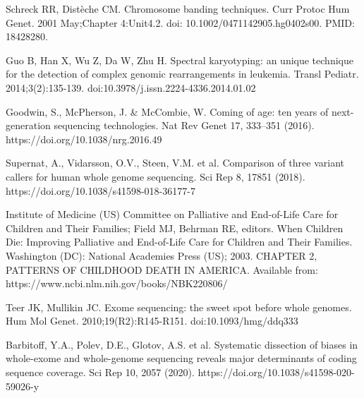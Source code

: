 \documentclass[a4paper,12pt]{article}
\begin{document}
\begin{thebibliography}{100}
Schreck RR, Distèche CM. Chromosome banding techniques. Curr Protoc Hum Genet. 2001 May;Chapter 4:Unit4.2. doi: 10.1002/0471142905.hg0402s00. PMID: 18428280.

Guo B, Han X, Wu Z, Da W, Zhu H. Spectral karyotyping: an unique technique for the detection of complex genomic rearrangements in leukemia. Transl Pediatr. 2014;3(2):135-139. doi:10.3978/j.issn.2224-4336.2014.01.02

Goodwin, S., McPherson, J. \& McCombie, W. Coming of age: ten years of next-generation sequencing technologies. Nat Rev Genet 17, 333–351 (2016). https://doi.org/10.1038/nrg.2016.49

Supernat, A., Vidarsson, O.V., Steen, V.M. et al. Comparison of three variant callers for human whole genome sequencing. Sci Rep 8, 17851 (2018). https://doi.org/10.1038/s41598-018-36177-7

Institute of Medicine (US) Committee on Palliative and End-of-Life Care for Children and Their Families; Field MJ, Behrman RE, editors. When Children Die: Improving Palliative and End-of-Life Care for Children and Their Families. Washington (DC): National Academies Press (US); 2003. CHAPTER 2, PATTERNS OF CHILDHOOD DEATH IN AMERICA. Available from: https://www.ncbi.nlm.nih.gov/books/NBK220806/

Teer JK, Mullikin JC. Exome sequencing: the sweet spot before whole genomes. Hum Mol Genet. 2010;19(R2):R145-R151. doi:10.1093/hmg/ddq333

Barbitoff, Y.A., Polev, D.E., Glotov, A.S. et al. Systematic dissection of biases in whole-exome and whole-genome sequencing reveals major determinants of coding sequence coverage. Sci Rep 10, 2057 (2020). https://doi.org/10.1038/s41598-020-59026-y

\end{thebibliography}
\end{document}
